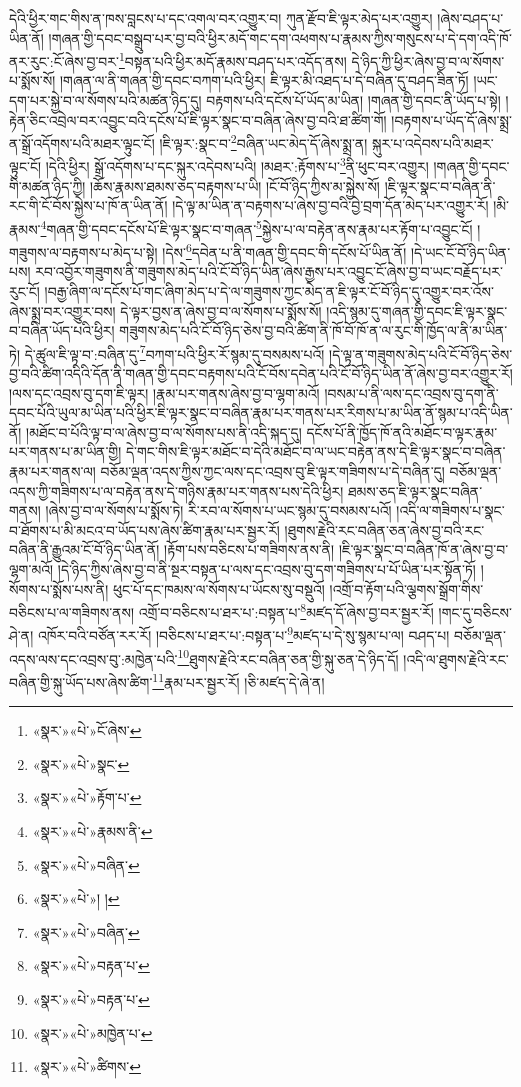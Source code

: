 དེའི་ཕྱིར་གང་གིས་ན་ཁས་བླངས་པ་དང་འགལ་བར་འགྱུར་བ། ཀུན་རྫོབ་ཇི་ལྟར་མེད་པར་འགྱུར། །ཞེས་བཤད་པ་ཡིན་ནོ། །གཞན་གྱི་དབང་བསྒྲུབ་པར་བྱ་བའི་ཕྱིར་མདོ་གང་དག་འཕགས་པ་རྣམས་ཀྱིས་གསུངས་པ་དེ་དག་འདི་ཁོ་ནར་རུང་:ངོ་ཞེས་བྱ་བར་\footnote{«སྣར་»«པེ་»ངོ་ཞེས་}བསྟན་པའི་ཕྱིར་མདོ་རྣམས་བཤད་པར་འདོད་ནས། དེ་ཉིད་ཀྱི་ཕྱིར་ཞེས་བྱ་བ་ལ་སོགས་པ་སྨོས་སོ། །གཞན་ལ་ནི་གཞན་གྱི་དབང་བཀག་པའི་ཕྱིར། ཇི་ལྟར་མི་འཐད་པ་དེ་བཞིན་དུ་བཤད་ཟིན་ཏོ། །ཡང་དག་པར་སྐྱེ་བ་ལ་སོགས་པའི་མཚན་ཉིད་དུ། བརྟགས་པའི་དངོས་པོ་ཡོད་མ་ཡིན། །གཞན་གྱི་དབང་ནི་ཡོད་པ་སྟེ། །རྟེན་ཅིང་འབྲེལ་བར་འབྱུང་བའི་དངོས་པོ་ཇི་ལྟར་སྣང་བ་བཞིན་ཞེས་བྱ་བའི་ཐ་ཚིག་གོ། །བརྟགས་པ་ཡོད་དོ་ཞེས་སྨྲ་ན་སྒྲོ་འདོགས་པའི་མཐར་ལྟུང་ངོ། །ཇི་ལྟར་:སྣང་བ་\footnote{«སྣར་»«པེ་»སྣང་}བཞིན་ཡང་མེད་དོ་ཞེས་སྨྲ་ན། སྐུར་པ་འདེབས་པའི་མཐར་ལྟུང་ངོ། །དེའི་ཕྱིར། སྒྲོ་འདོགས་པ་དང་སྐུར་འདེབས་པའི། །མཐར་:རྟོགས་པ་\footnote{«སྣར་»«པེ་»རྟོག་པ་}ནི་ཕུང་བར་འགྱུར། །གཞན་གྱི་དབང་གི་མཚན་ཉིད་ཀྱི། །ཆོས་རྣམས་ཐམས་ཅད་བརྟགས་པ་ཡི། །ངོ་བོ་ཉིད་ཀྱིས་མ་སྐྱེས་སོ། །ཇི་ལྟར་སྣང་བ་བཞིན་ནི་རང་གི་ངོ་བོས་སྐྱེས་པ་ཁོ་ན་ཡིན་ནོ། །དེ་ལྟ་མ་ཡིན་ན་བརྟགས་པ་ཞེས་བྱ་བའི་བྱེ་བྲག་དོན་མེད་པར་འགྱུར་རོ། །མི་རྣམས་\footnote{«སྣར་»«པེ་»རྣམས་ནི་}གཞན་གྱི་དབང་དངོས་པོ་ཇི་ལྟར་སྣང་བ་གཞན་\footnote{«སྣར་»«པེ་»བཞིན་}སྐྱེས་པ་ལ་བརྟེན་ནས་རྣམ་པར་རྟོག་པ་འབྱུང་ངོ། །གཟུགས་ལ་བརྟགས་པ་མེད་པ་སྟེ། །དེས་\footnote{«སྣར་»«པེ་»། །}དབེན་པ་ནི་གཞན་གྱི་དབང་གི་དངོས་པོ་ཡིན་ནོ། །དེ་ཡང་ངོ་བོ་ཉིད་ཡིན་པས། རབ་འབྱོར་གཟུགས་ནི་གཟུགས་མེད་པའི་ངོ་བོ་ཉིད་ཡིན་ཞེས་རྒྱས་པར་འབྱུང་ངོ་ཞེས་བྱ་བ་ཡང་བརྗོད་པར་རུང་ངོ། །བརྒྱ་ཞིག་ལ་དངོས་པོ་གང་ཞིག་མེད་པ་དེ་ལ་གཟུགས་ཀྱང་མེད་ན་ཇི་ལྟར་ངོ་བོ་ཉིད་དུ་འགྱུར་བར་འོས་ཞེས་སྨྲ་བར་འགྱུར་བས། དེ་ལྟར་བྱས་ན་ཞེས་བྱ་བ་ལ་སོགས་པ་སྨོས་སོ། །འདི་སྙམ་དུ་གཞན་གྱི་དབང་ཇི་ལྟར་སྣང་བ་བཞིན་ཡོད་པའི་ཕྱིར། གཟུགས་མེད་པའི་ངོ་བོ་ཉིད་ཅེས་བྱ་བའི་ཚིག་ནི་ཁོ་བོ་ཁོ་ན་ལ་རུང་གི་ཁྱོད་ལ་ནི་མ་ཡིན་ཏེ། དེ་ཚུལ་ཇི་ལྟ་བ་:བཞིན་དུ་\footnote{«སྣར་»«པེ་»བཞིན་}བཀག་པའི་ཕྱིར་རོ་སྙམ་དུ་བསམས་པའོ། །དེ་ལྟ་ན་གཟུགས་མེད་པའི་ངོ་བོ་ཉིད་ཅེས་བྱ་བའི་ཚིག་འདིའི་དོན་ནི་གཞན་གྱི་དབང་བརྟགས་པའི་ངོ་བོས་དབེན་པའི་ངོ་བོ་ཉིད་ཡིན་ནོ་ཞེས་བྱ་བར་འགྱུར་རོ། །ལས་དང་འབྲས་བུ་དག་ཇི་ལྟར། །རྣམ་པར་གནས་ཞེས་བྱ་བ་ལྷག་མའོ། །བསམ་པ་ནི་ལས་དང་འབྲས་བུ་དག་ནི་དབང་པོའི་ཡུལ་མ་ཡིན་པའི་ཕྱིར་ཇི་ལྟར་སྣང་བ་བཞིན་རྣམ་པར་གནས་པར་རིགས་པ་མ་ཡིན་ནོ་སྙམ་པ་འདི་ཡིན་ནོ། །མཐོང་བ་པོའི་ལྟ་བ་ལ་ཞེས་བྱ་བ་ལ་སོགས་པས་ནི་འདི་སྐད་དུ། དངོས་པོ་ནི་ཁྱོད་ཁོ་ནའི་མཐོང་བ་ལྟར་རྣམ་པར་གནས་པ་མ་ཡིན་གྱི། དེ་གང་གིས་ཇི་ལྟར་མཐོང་བ་དེའི་མཐོང་བ་ལ་ཡང་བརྟེན་ནས་དེ་ཇི་ལྟར་སྣང་བ་བཞིན་རྣམ་པར་གནས་ལ། བཅོམ་ལྡན་འདས་ཀྱིས་ཀྱང་ལས་དང་འབྲས་བུ་ཇི་ལྟར་གཟིགས་པ་དེ་བཞིན་དུ། བཅོམ་ལྡན་འདས་ཀྱི་གཟིགས་པ་ལ་བརྟེན་ནས་དེ་གཉིས་རྣམ་པར་གནས་པས་དེའི་ཕྱིར། ཐམས་ཅད་ཇི་ལྟར་སྣང་བཞིན་གནས། །ཞེས་བྱ་བ་ལ་སོགས་པ་སྨོས་ཏེ། རི་རབ་ལ་སོགས་པ་ཡང་སྙམ་དུ་བསམས་པའོ། །འདི་ལ་གཟིགས་པ་སྣང་བ་ཐོགས་པ་མི་མངའ་བ་ཡོད་པས་ཞེས་ཚིག་རྣམ་པར་སྦྱར་རོ། །ཐུགས་རྗེའི་རང་བཞིན་ཅན་ཞེས་བྱ་བའི་རང་བཞིན་ནི་རྒྱུའམ་ངོ་བོ་ཉིད་ཡིན་ནོ། །རྟོག་པས་བཅིངས་པ་གཟིགས་ནས་ནི། །ཇི་ལྟར་སྣང་བ་བཞིན་ཁོ་ན་ཞེས་བྱ་བ་ལྷག་མའོ། །དེ་ཉིད་ཀྱིས་ཞེས་བྱ་བ་ནི་སྔར་བསྟན་པ་ལས་དང་འབྲས་བུ་དག་གཟིགས་པ་པོ་ཡིན་པར་སྟོན་ཏོ། །སོགས་པ་སྨོས་པས་ནི། ཕུང་པོ་དང་ཁམས་ལ་སོགས་པ་ཡོངས་སུ་བསྡུའོ། །འགྲོ་བ་རྟོག་པའི་ལྕགས་སྒྲོག་གིས་བཅིངས་པ་ལ་གཟིགས་ནས། འགྲོ་བ་བཅིངས་པ་ཐར་པ་:བསྟན་པ་\footnote{«སྣར་»«པེ་»བརྟན་པ་}མཛད་དོ་ཞེས་བྱ་བར་སྦྱར་རོ། །གང་དུ་བཅིངས་ཤེ་ན། འཁོར་བའི་བཙོན་རར་རོ། །བཅིངས་པ་ཐར་པ་:བསྟན་པ་\footnote{«སྣར་»«པེ་»བརྟན་པ་}མཛད་པ་དེ་སུ་སྙམ་པ་ལ། བཤད་པ། བཅོམ་ལྡན་འདས་ལས་དང་འབྲས་བུ་:མཁྱེན་པའི་\footnote{«སྣར་»«པེ་»མཁྱེན་པ་}ཐུགས་རྗེའི་རང་བཞིན་ཅན་གྱི་སྐུ་ཅན་དེ་ཉིད་དོ། །འདི་ལ་ཐུགས་རྗེའི་རང་བཞིན་གྱི་སྐུ་ཡོད་པས་ཞེས་ཚིག་\footnote{«སྣར་»«པེ་»ཚིགས་}རྣམ་པར་སྦྱར་རོ། །ཅི་མཛད་དེ་ཞེ་ན། 